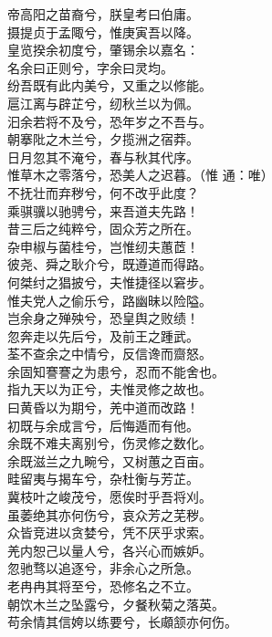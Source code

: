 \documentclass[]{article}
\begin{document}
帝高阳之苗裔兮，朕皇考曰伯庸。\\
摄提贞于孟陬兮，惟庚寅吾以降。\\
皇览揆余初度兮，肇锡余以嘉名：\\
名余曰正则兮，字余曰灵均。\\
纷吾既有此内美兮，又重之以修能。\\
扈江离与辟芷兮，纫秋兰以为佩。\\
汩余若将不及兮，恐年岁之不吾与。\\
朝搴阰之木兰兮，夕揽洲之宿莽。\\
日月忽其不淹兮，春与秋其代序。\\
惟草木之零落兮，恐美人之迟暮。（惟 通：唯）\\
不抚壮而弃秽兮，何不改乎此度？\\
乘骐骥以驰骋兮，来吾道夫先路！\\
昔三后之纯粹兮，固众芳之所在。\\
杂申椒与菌桂兮，岂惟纫夫蕙茝！\\
彼尧、舜之耿介兮，既遵道而得路。\\
何桀纣之猖披兮，夫惟捷径以窘步。\\
惟夫党人之偷乐兮，路幽昧以险隘。\\
岂余身之殚殃兮，恐皇舆之败绩！\\
忽奔走以先后兮，及前王之踵武。\\
荃不查余之中情兮，反信谗而齌怒。\\
余固知謇謇之为患兮，忍而不能舍也。\\
指九天以为正兮，夫惟灵修之故也。\\
曰黄昏以为期兮，羌中道而改路！\\
初既与余成言兮，后悔遁而有他。\\
余既不难夫离别兮，伤灵修之数化。\\
余既滋兰之九畹兮，又树蕙之百亩。\\
畦留夷与揭车兮，杂杜衡与芳芷。\\
冀枝叶之峻茂兮，愿俟时乎吾将刈。\\
虽萎绝其亦何伤兮，哀众芳之芜秽。\\
众皆竞进以贪婪兮，凭不厌乎求索。\\
羌内恕己以量人兮，各兴心而嫉妒。\\
忽驰骛以追逐兮，非余心之所急。\\
老冉冉其将至兮，恐修名之不立。\\
朝饮木兰之坠露兮，夕餐秋菊之落英。\\
苟余情其信姱以练要兮，长顑颔亦何伤。\\
\end{document}
